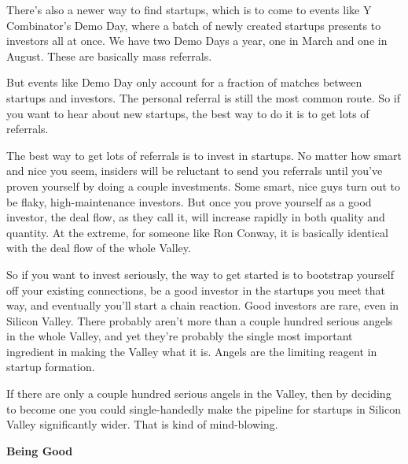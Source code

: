 There's
                  also a newer way to find startups, which is to come to events
                  like Y Combinator's Demo Day, where a batch of newly created
                  startups presents to investors all at once. We have two Demo
                  Days a year, one in March and one in August. These are
                  basically mass referrals.

But events like Demo Day
                  only account for a fraction of matches between startups and
                  investors. The personal referral is still the most common
                  route. So if you want to hear about new startups, the best way
                  to do it is to get lots of referrals.

The best way
                  to get lots of referrals is to invest in startups. No matter
                  how smart and nice you seem, insiders will be reluctant to
                  send you referrals until you've proven yourself by doing a
                  couple investments. Some smart, nice guys turn out to be
                  flaky, high-maintenance investors. But once you prove yourself
                  as a good investor, the deal flow, as they call it, will
                  increase rapidly in both quality and quantity. At the extreme,
                  for someone like Ron Conway, it is basically identical with
                  the deal flow of the whole Valley.

So if you want
                  to invest seriously, the way to get started is to bootstrap
                  yourself off your existing connections, be a good investor in
                  the startups you meet that way, and eventually you'll start a
                  chain reaction. Good investors are rare, even in Silicon
                  Valley. There probably aren't more than a couple hundred
                  serious angels in the whole Valley, and yet they're probably
                  the single most important ingredient in making the Valley what
                  it is. Angels are the limiting reagent in startup
                  formation.

If there are only a couple hundred
                  serious angels in the Valley, then by deciding to become one
                  you could single-handedly make the pipeline for startups in
                  Silicon Valley significantly wider. That is kind of
                  mind-blowing.

\textbf{Being Good}

